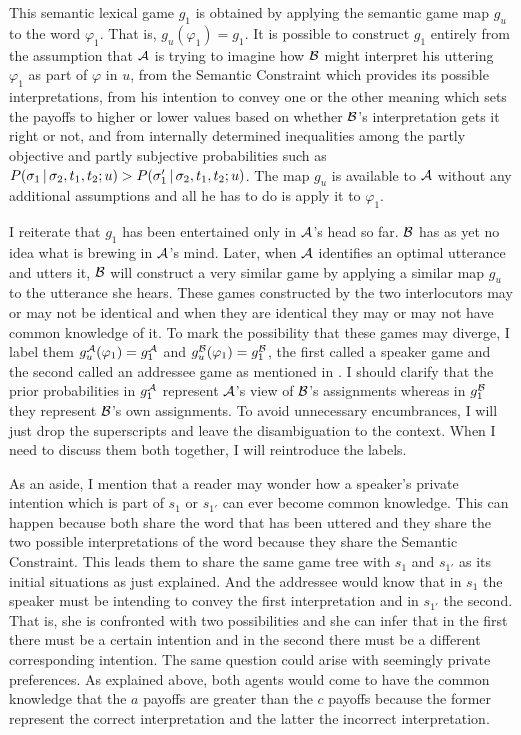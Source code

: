 This semantic lexical game $g_1$ is obtained by applying the semantic game map $g_u$ to the word $\varphi_1$. That is, $g_u(\varphi_1) = g_1$. It is possible to construct $g_1$ entirely from the assumption that $\cal A$ is trying to imagine how $\cal B$ might interpret his uttering $\varphi_1$ as part of $\varphi$ in $u$, from the Semantic Constraint which provides its possible interpretations, from his intention to convey one or the other meaning which sets the payoffs to higher or lower values based on whether $\cal B$'s interpretation gets it right or not, and from internally determined inequalities among the partly objective and partly subjective probabilities such as $P(\sigma_1 \,|\, \sigma_2, t_1, t_2; u) > P(\sigma'_1 \,|\, \sigma_2, t_1, t_2; u)$. The map $g_u$ is available to $\cal A$ without any additional assumptions and all he has to do is apply it to $\varphi_1$.

I reiterate that $g_1$ has been entertained only in $\cal A$'s head so far. $\cal B$ has as yet no idea what is brewing in $\cal A$'s mind. Later, when $\cal A$ identifies an optimal utterance and utters it, $\cal B$ will construct a very similar game by applying a similar map $g_u$ to the utterance she hears. These games constructed by the two interlocutors may or may not be identical and when they are identical they may or may not have common knowledge of it. To mark the possibility that these games may diverge, I label them $g^{\cal A}_u(\varphi_1) = g^{\cal A}_1$ and $g^{\cal B}_u(\varphi_1) = g^{\cal B}_1$, the first called a speaker game and the second called an addressee game as mentioned in . I should clarify that the prior probabilities in $g^{\cal A}_1$ represent $\cal A$'s view of $\cal B$'s assignments whereas in $g^{\cal B}_1$ they represent $\cal B$'s own assignments. To avoid unnecessary encumbrances, I will just drop the superscripts and leave the disambiguation to the context. When I need to discuss them both together, I will reintroduce the labels.

As an aside, I mention that a reader may wonder how a speaker's private intention which is part of $s_{1}$ or $s_{1'}$ can ever become common knowledge. This can happen because both share the word that has been uttered and they share the two possible interpretations of the word because they share the Semantic Constraint. This leads them to share the same game tree with $s_{1}$ and $s_{1'}$ as its initial situations as just explained. And the addressee would know that in $s_{1}$ the speaker must be intending to convey the first interpretation and in $s_{1'}$ the second. That is, she is confronted with two possibilities and she can infer that in the first there must be a certain intention and in the second there must be a different corresponding intention. The same question could arise with seemingly private preferences. As explained above, both agents would come to have the common knowledge that the $a$ payoffs are greater than the $c$ payoffs because the former represent the correct interpretation and the latter the incorrect interpretation.

